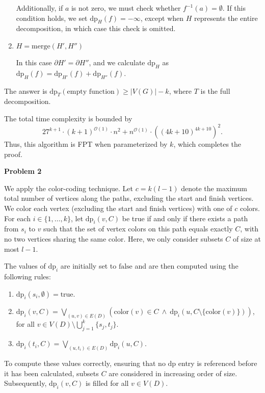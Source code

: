 \documentclass[12pt]{article}
\begin{document}
\begin{enumerate}
		      Additionally, if \(a\) is not zero, we must check whether
		      \(f^{-1}(a) = \emptyset\). If this condition holds, we set
		      \(\text{dp}_{H}(f) = -\infty\), except when \(H\) represents the
		      entire decomposition, in which case this check is omitted.
		
		\item \(H = \text{merge}(H', H'')\)
		      
		      In this case \(\partial H' = \partial H''\), and we calculate
		      \(\text{dp}_{H}\) as \(\text{dp}_{H}(f) = \text{dp}_{H'}(f) +
		      \text{dp}_{H''}(f)\).
	\end{enumerate}
	The answer is \(\text{dp}_{T}(\text{empty function}) \geqslant |V(G)| - k\),
	where \(T\) is the full decomposition.
	
	\medskip
	
	The total time complexity is bounded by
	\[ 27^{k + 1} \cdot (k + 1)^{\mathcal{O}(1)} \cdot n^{2} +
	n^{\mathcal{O}(1)} \cdot \left( (4k + 10)^{4k + 10} \right)^{2} \text{.} \]
	Thus, this algorithm is FPT when parameterized by \(k\), which completes the
	proof.
	
	\bigskip
	
	\textbf{Problem 2}
	
	\medskip
	
	We apply the color-coding technique. Let \(c = k(l - 1)\) denote the
	maximum total number of vertices along the paths, excluding the start and
	finish vertices. We color each vertex (excluding the start and finish
	vertices) with one of \(c\) colors. For each \(i \in \{1, \ldots, k\}\), let
	\(\text{dp}_{i}(v, C)\) be true if and only if there exists a path from
	\(s_{i}\) to \(v\) such that the set of vertex colors on this path equals
	exactly \(C\), with no two vertices sharing the same color. Here, we only
	consider subsets \(C\) of size at most \(l - 1\).
	
	\medskip
	
	The values of \(\text{dp}_{i}\) are initially set to \(\text{false}\) and
	are then computed using the following rules:
	\begin{enumerate}
		\item \(\text{dp}_{i}(s_{i}, \emptyset) = \text{true}\).
		\item \(\text{dp}_{i}(v, C) = \bigvee\limits_{(u, v) \in E(D)}
		      (\text{color}(v) \in C \ \wedge \ \text{dp}_{i}(u, C \setminus
		      \{\text{color}(v)\}))\), for all \(v \in V(D) \setminus
		      \bigcup\limits_{j = 1}^{k} \{s_{j}, t_{j}\}\).
		\item \(\text{dp}_{i}(t_{i}, C) = \bigvee\limits_{(u, t_{i}) \in E(D)}
		      \text{dp}_{i}(u, C)\).
	\end{enumerate}
	To compute these values correctly, ensuring that no \(\text{dp}\) entry is
	referenced before it has been calculated, subsets \(C\) are considered in
	increasing order of size. Subsequently, \(\text{dp}_{i}(v, C)\) is filled
	for all \(v \in V(D)\).
	
\end{document}
